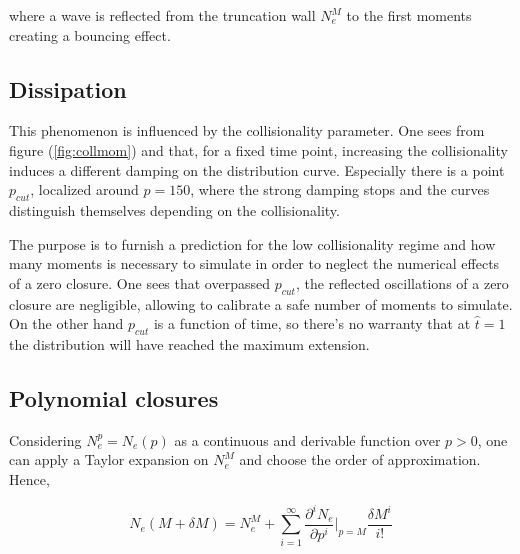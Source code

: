\documentclass[final]{jpp}
\begin{document}
 where a wave is reflected from the truncation wall $N_e^M$ to the first moments creating a bouncing effect.

\subsection{Dissipation}

This phenomenon is influenced by the collisionality parameter. One sees from figure (\ref{fig:collmom}) and that, for a fixed time point, increasing the collisionality induces a different damping on the distribution curve. Especially there is a point $p_{cut}$, localized around $p = 150$, where the strong damping stops and the curves distinguish themselves depending on the collisionality.

\noindent
\begin{minipage}{\textwidth}
\begin{minipage}{0.47\textwidth}
The purpose is to furnish a prediction for the low collisionality regime and how many moments is necessary to simulate in order to neglect the numerical effects of a zero closure. One sees that overpassed $p_{cut}$, the reflected oscillations of a zero closure are negligible, allowing to calibrate a safe number of moments to simulate. 
\\
On the other hand $p_{cut}$ is a function of time, so there's no warranty that at $\hat{t} = 1$ the distribution will have reached the maximum extension. 
\end{minipage}
\hspace{0.05\textwidth}
\begin{minipage}{0.47\textwidth}
\resizebox{\textwidth}{!}{
    
}
\label{fig:collmom}
\end{minipage}
\end{minipage}

\subsection{Polynomial closures}

Considering $N_e^p = N_e(p)$ as a continuous and derivable function over $p > 0$, one can apply a Taylor expansion on $N_e^M$ and choose the order of approximation. Hence,

\begin{equation}
N_e(M + \delta M) = N_e^M + \sum_{i = 1}^\infty \frac{\partial^i N_e}{\partial p^i}|_{p=M} \frac{\delta M^i}{i!}
\end{equation}
\end{document}
